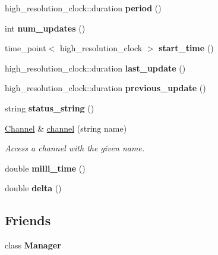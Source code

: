 \begin{DoxyCompactItemize}
high\+\_\+resolution\+\_\+clock\+::duration {\bfseries period} ()
\item 
\mbox{\label{classelma_1_1_process_a8da013223752f15787a3ff5ed2190211}} 
int {\bfseries num\+\_\+updates} ()
\item 
\mbox{\label{classelma_1_1_process_a347b1fd6fd7501bfd4b3ac63a9ee811e}} 
time\+\_\+point$<$ high\+\_\+resolution\+\_\+clock $>$ {\bfseries start\+\_\+time} ()
\item 
\mbox{\label{classelma_1_1_process_a809b1e38a5504600d252f8f62a8bf487}} 
high\+\_\+resolution\+\_\+clock\+::duration {\bfseries last\+\_\+update} ()
\item 
\mbox{\label{classelma_1_1_process_a2252f8767f4f437297c8a342b60b484e}} 
high\+\_\+resolution\+\_\+clock\+::duration {\bfseries previous\+\_\+update} ()
\item 
\mbox{\label{classelma_1_1_process_aeef9e71fc307480c7d90639775d6ce71}} 
string {\bfseries status\+\_\+string} ()
\item 
\mbox{\hyperlink{classelma_1_1_channel}{Channel}} \& \mbox{\hyperlink{classelma_1_1_process_ab392ade636276d047634df7605970164}{channel}} (string name)
\begin{DoxyCompactList}\small\item\em Access a channel with the given name. \end{DoxyCompactList}\item 
\mbox{\label{classelma_1_1_process_a713075c26ec23e09576ec966fb4be6ea}} 
double {\bfseries milli\+\_\+time} ()
\item 
\mbox{\label{classelma_1_1_process_ae2c6efe05132c558fe44c0cf301113e2}} 
double {\bfseries delta} ()
\end{DoxyCompactItemize}
\subsection*{Friends}
\begin{DoxyCompactItemize}
\item 
\mbox{\label{classelma_1_1_process_adddd5c43ff870a047aa66db4edf82a7e}} 
class {\bfseries Manager}
\end{DoxyCompactItemize}


